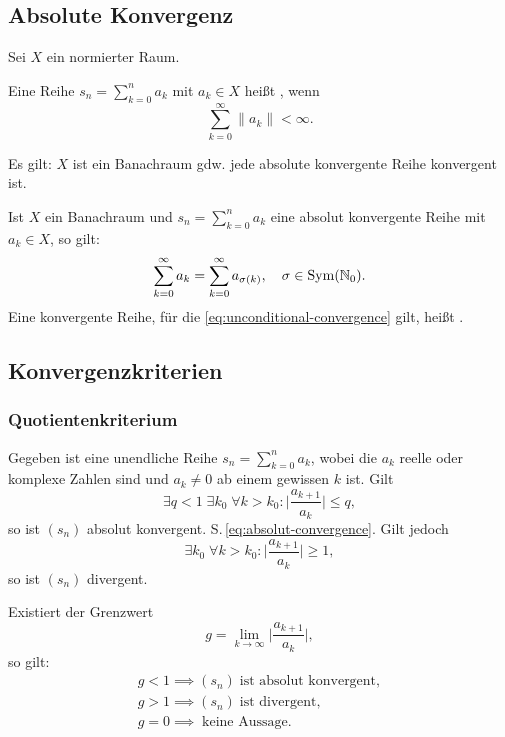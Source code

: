 \subsection{Absolute Konvergenz}
Sei $X$ ein normierter Raum.
\begin{Definition}
Eine Reihe $s_n=\sum_{k=0}^n a_k$ mit $a_k\in X$
heißt , wenn
\begin{equation}\label{eq:absolut-convergence}\textstyle
\sum_{k=0}^\infty \|a_k\| < \infty.
\end{equation}
\end{Definition}
\noindent
Es gilt: $X$ ist ein Banachraum gdw. jede absolute konvergente
Reihe konvergent ist.

Ist $X$ ein Banachraum und $s_n=\sum_{k=0}^n a_k$ eine
absolut konvergente Reihe mit $a_k\in X$, so gilt:
\begin{equation}\label{eq:unconditional-convergence}
\sum_{k=0}^\infty a_k = \sum_{k=0}^\infty a_{\sigma(k)},\quad
\sigma\in\operatorname{Sym}(\mathbb N_0).
\end{equation}
Eine konvergente Reihe, für die \eqref{eq:unconditional-convergence}
gilt, heißt .

\subsection{Konvergenzkriterien}
\subsubsection{Quotientenkriterium}
Gegeben ist eine unendliche Reihe $s_n=\sum_{k=0}^n a_k$, wobei
die $a_k$ reelle oder komplexe Zahlen sind und $a_k\ne 0$ ab einem
gewissen $k$ ist. Gilt
\begin{equation}
\exists q{<}1\;\exists k_0\;\forall k{>}k_0\colon \bigg|\frac{a_{k+1}}{a_k}\bigg|\le q,
\end{equation}
so ist $(s_n)$ absolut konvergent. S.\,\eqref{eq:absolut-convergence}.
Gilt jedoch
\begin{equation}
\exists k_0\;\forall k{>}k_0\colon\bigg|\frac{a_{k+1}}{a_k}\bigg|\ge 1,
\end{equation}
so ist $(s_n)$ divergent.

Existiert der Grenzwert
\begin{equation}
g = \lim_{k\to\infty}\bigg|\frac{a_{k+1}}{a_k}\bigg|,
\end{equation}
so gilt:
\begin{gather}
g<1\implies(s_n)\;\text{ist absolut konvergent},\\
g>1\implies(s_n)\;\text{ist divergent},\\
g=0\implies\;\text{keine Aussage}.
\end{gather}

